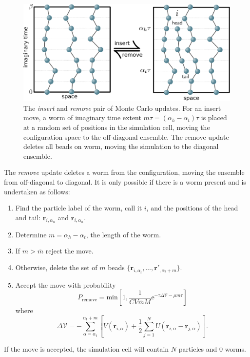 \documentclass[prb,10pt,aps,floatfix,notitlepage]{revtex4-1}
\renewcommand{\vec}[1]{\boldsymbol{#1}}
\newcommand{\e}[1]{\mathrm{e}^{#1}}
\begin{document}
\begin{figure}
\begin{center}
\includegraphics[width=0.70\columnwidth]{Figures/insertremove.pdf}
\end{center}
\caption{The \emph{insert} and \emph{remove} pair of Monte Carlo updates.  For
an insert move, a worm of imaginary time extent $m\tau = (\alpha_h -
\alpha_t)\tau$ is placed at a random set of positions in the simulation cell,
moving the configuration space to the off-diagonal ensemble.  The remove update
deletes all beads on worm, moving the simulation to the diagonal ensemble.} 
\label{fig:insertremove}
 \end{figure}
%

\noindent
The \emph{remove} update deletes a worm from the configuration, moving the
ensemble from off-diagonal to diagonal. It is only possible if there is a worm
present and is undertaken as follows:
\begin{enumerate}
    \item Find the particle label of the worm, call it $i$, and the positions
        of the head and tail: $\vec{r}_{i,\alpha_h}$ and
        $\vec{r}_{i,\alpha_h}$.
    \item Determine $m = \alpha_h - \alpha_t$, the length of the worm.
    \item If $m > \overline{m}$ reject the move.
    \item Otherwise, delete the set of $m$ beads $\{\vec{r}_{i,\alpha_t},\ldots,
    \vec{r}'_{,\alpha_t+m}\}$.
\item Accept the move with probability
\begin{equation}
    P_{\text{remove}} = \mathrm{min} \left[1,
    \frac{1}{C V \overline{m}M} \e{-\tau \Delta \mathcal{V} - \mu m \tau} \right]
\end{equation}
%
where
%
\begin{equation}
    \Delta\mathcal{V} = -\sum_{\alpha=\alpha_t}^{\alpha_t+m} \left[ 
        V(\vec{r}_{i,\alpha}) + \frac{1}{2}\sum_{j=1}^N
        U(\vec{r}_{i,\alpha}-\vec{r}_{j,\alpha}) \right].
\end{equation}
%
\end{enumerate}
If the move is accepted, the simulation cell will contain $N$ particles and 0
worms.
\end{document}

